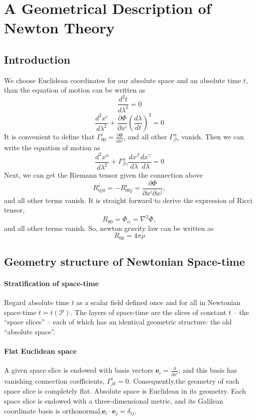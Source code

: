 \chapter{A Geometrical Description of Newton Theory}
\section{Introduction}
\noindent
We choose Euclidean coordinates for our absolute space and an absolute time $t$, than the equation of motion can be written as
\[\frac{d^2 t}{d\lambda^2} = 0\]
\[\frac{d^2 x^i}{d\lambda^2} + \frac{\partial \Phi}{\partial x^i} (\frac{d\lambda}{dt})^2=0\]
It is convenient to define that $\Gamma^i_{00} = \frac{\partial \Phi}{\partial x^i}$, and all other $\Gamma^{\alpha}_{\beta \gamma}$ vanish. Then we can write the equation of motion as
\[\frac{d^2 x^{\alpha}}{d\lambda^2} + \Gamma^{\alpha}_{\beta \gamma} \frac{dx^{\beta}}{d \lambda} \frac{dx^{\gamma}}{d \lambda}=0\]
Next, we can get the Riemann tensor given the connection above\[
R^i_{0j0} = -R^i_{00j} = \frac{\partial \Phi}{\partial x^i \partial x^j},
\]and all other terms vanish. It is straight forward to derive the expression of Ricci tensor,
\[R_{00} = \Phi_{ii} = \nabla^2\Phi,\]and all other terms vanish.
So, newton gravity law can be written as
\[R_{00} = 4\pi\rho\]

\section{Geometry structure of Newtonian Space-time}
\subsubsection{Stratification of space-time}
Regard absolute time $t$ as a scalar field defined once and for all in Newtonian space-time $t=t(\mathcal{P})$. The layers of space-time are the slices of constant $t$ -- the ``space slices'' -- each of which has an identical geometric structure: the old ``absolute space''.

\subsubsection{Flat Euclidean space}
A given space slice is endowed with basis vectors $\bm{e}_i = \frac{\partial}{\partial x^i}$; and this basis has vanishing connection coefficients, $\Gamma^i_{jk} = 0$. Consequently,the geometry of each space slice is completely flat. Absolute space is Euclidean in its geometry. 
Each space slice is endowed with a three-dimensional metric, and its Galilean coordinate basis is orthonormal,$\bm{e}_i \cdot \bm{e}_j = \delta_{ij}$.

